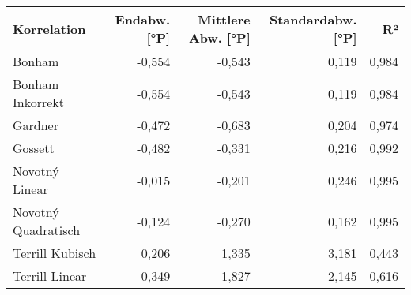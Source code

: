 \begin{tabular}{lrrrr}
\toprule
        Korrelation &  Endabw. [°P] &  Mittlere Abw. [°P] &  Standardabw. [°P] &    R² \\
\midrule
             Bonham &        -0,554 &              -0,543 &              0,119 & 0,984 \\
   Bonham Inkorrekt &        -0,554 &              -0,543 &              0,119 & 0,984 \\
            Gardner &        -0,472 &              -0,683 &              0,204 & 0,974 \\
            Gossett &        -0,482 &              -0,331 &              0,216 & 0,992 \\
     Novotný Linear &        -0,015 &              -0,201 &              0,246 & 0,995 \\
Novotný Quadratisch &        -0,124 &              -0,270 &              0,162 & 0,995 \\
    Terrill Kubisch &         0,206 &               1,335 &              3,181 & 0,443 \\
     Terrill Linear &         0,349 &              -1,827 &              2,145 & 0,616 \\
\bottomrule
\end{tabular}

